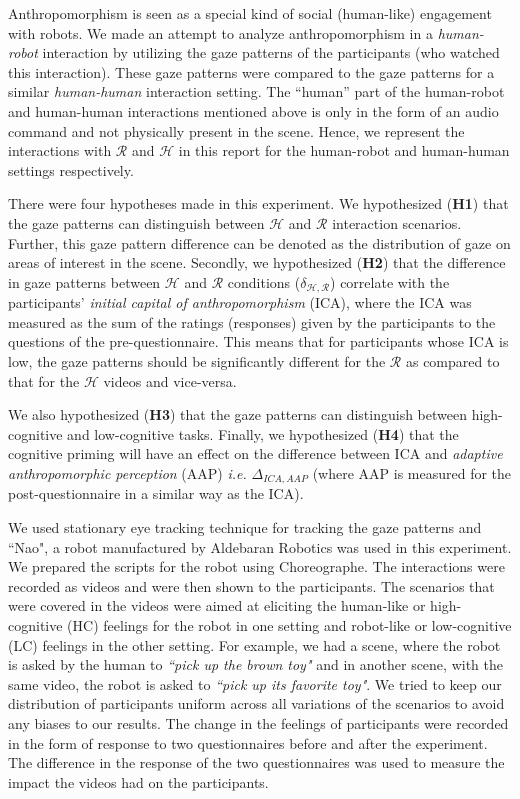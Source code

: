 \documentclass[a4,twocolumn,10pt]{article}
\newcommand{\ie}{{\textit{i.e.\xspace}}}
\begin{document}
Anthropomorphism is seen as a special kind of social (human-like) engagement
with robots. We made an attempt to analyze anthropomorphism in a
\textit{human-robot} interaction by utilizing the gaze patterns of the
participants (who watched this interaction). These gaze patterns were compared
to the gaze patterns for a similar \textit{human-human} interaction setting. The
``human'' part of the human-robot and human-human interactions mentioned above
is only in the form of an audio command and not physically present in the scene.
Hence, we represent the interactions with $\mathcal{R}$ and $\mathcal{H}$ in
this report for the human-robot and human-human settings respectively.

There were four hypotheses made in this experiment. We hypothesized
(\textbf{H1}) that the gaze patterns can distinguish between $\mathcal{H}$ and
$\mathcal{R}$ interaction scenarios. Further, this gaze pattern difference can
be denoted as the distribution of gaze on areas of interest in the scene.
Secondly, we hypothesized (\textbf{H2}) that the difference in gaze patterns
between $\mathcal{H}$ and $\mathcal{R}$ conditions
($\delta_{\mathcal{H},\mathcal{R}}$) correlate with the participants'
\textit{initial capital of anthropomorphism} (ICA), where the ICA was measured
as the sum of the ratings (responses) given by the participants to the questions
of the pre-questionnaire. This means that for participants whose ICA is low, the
gaze patterns should be significantly different for the $\mathcal{R}$ as
compared to that for the $\mathcal{H}$ videos and vice-versa.

We also hypothesized (\textbf{H3}) that the gaze patterns can distinguish
between high-cognitive and low-cognitive tasks. Finally, we hypothesized
(\textbf{H4}) that the cognitive priming will have an effect on the difference
between ICA and \textit{adaptive anthropomorphic perception} (AAP) \ie
$\Delta_{ICA,AAP}$ (where AAP is measured for the post-questionnaire in a
similar way as the ICA).

We used stationary eye tracking technique for tracking the gaze patterns and
``Nao", a robot manufactured by Aldebaran Robotics was used in this
experiment. We prepared the scripts for the robot using Choreographe. The
interactions were recorded as videos and were then shown to the participants.
The scenarios that were covered in the videos were aimed at eliciting the
human-like or high-cognitive (HC) feelings for the robot in one setting and
robot-like or low-cognitive (LC) feelings in the other setting. For example, we
had a scene, where the robot is asked by the human to \textit{``pick up the
brown toy"} and in another scene, with the same video, the robot is asked to
\textit{``pick up its favorite toy"}. We tried to keep our distribution of
participants uniform across all variations of the scenarios to avoid any biases
to our results. The change in the feelings of participants were recorded in the
form of response to two questionnaires before and after the experiment. The
difference in the response of the two questionnaires was used to measure the
impact the videos had on the participants. 
\end{document}
